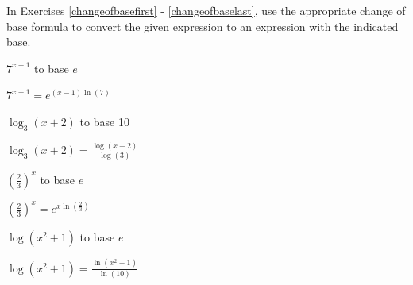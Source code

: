 \documentclass{ximera}
\begin{document}
\begin{question}
    
In Exercises \ref{changeofbasefirst} - \ref{changeofbaselast}, use the appropriate change of base formula to convert the given expression to an expression with the indicated base. 

\begin{problem}\label{changeofbasefirst}
    $7^{x - 1}$ to base $e$

    \begin{solution}
        $7^{x - 1} = e^{(x - 1)\ln(7)}$
    \end{solution}
\end{problem}

\begin{problem}
    $\log_{3}(x + 2)$ to base 10

\begin{solution}
$\log_{3}(x + 2) = \frac{\log(x + 2)}{\log(3)}$
\end{solution}
\end{problem}

\begin{problem}
    $\left(\frac{2}{3}\right)^{x}$ to base $e$

    \begin{solution}
        $\left(\frac{2}{3}\right)^{x} = e^{x\ln(\frac{2}{3})}$
    \end{solution}
\end{problem}

\begin{problem}\label{changeofbaselast}
    $\log(x^{2} + 1)$ to base $e$

\begin{solution}
$\log(x^{2} + 1) = \frac{\ln(x^{2} + 1)}{\ln(10)}$
\end{solution}
\end{problem}

\end{question}
\end{document}
